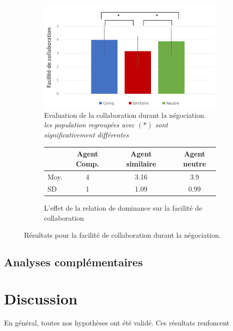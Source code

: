 			\begin{figure}[h]
			
			\begin{subfigure}[h]{0.8\textwidth}
				\centering
				\includegraphics[clip=false]{Figures/chap7/aisee.PNG}
				\caption{ Evaluation de la collaboration durant la négociation. \textit{les population regroupées avec $(*)$ sont significativement différentes }}
			\end{subfigure}
			
			\begin{subfigure}[h]{0.8\textwidth}
				
				\centering
				\begin{tabular}{ l c c c c c }
					\hline
					\textbf{ }& \textbf{Agent Comp.} & &  \textbf{Agent similaire} & & \textbf{Agent neutre} \\ 
					\hline
					\newline Moy. & 4 & & 3.16 & & 3.9 \\
					\newline SD & 1 & & 1.09  & & 0.99   \\
					\hline
					
				\end{tabular}
				\caption{L'effet de la relation de dominance sur la facilité de collaboration} 
			\end{subfigure}
			\caption{Résultats pour la facilité de collaboration durant la négociation.}
			\label{fig:aise}
		\end{figure}
		
			
\subsection{Analyses complémentaires}

\section{Discussion}
\label{sec:discussion}
En général, toutes nos hypothèses ont été validé. Ces résultats renfoncent 

